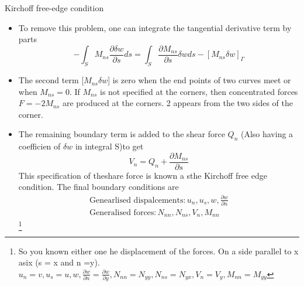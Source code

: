 	\begin{frame}{Kirchoff free-edge condition}
		\begin{itemize}
			\item To remove this problem, one can integrate the tangential derivative term by parts
			\begin{equation}
				-\int_S M_{ns}\frac{\partial \delta w}{\partial s} ds = \int_S \frac{\partial M_{ns}}{\partial s}\delta w ds - [M_{ns}\delta w]_{\Gamma}
			\end{equation}
			\item The second term [$M_{ns}\delta w$] is zero when the end points of two curves meet or when $M_{ns} = 0$. If $M_{ns}$ is not specified at the corners, then concentrated forces $F = -2M_{ns}$ are produced at the corners. 2 appears from the two sides of the corner. 
			\item The remaining boundary term is added to the shear force $Q_n$ (Also having a coefficien of $\delta w$ in integral  S)to get
			\begin{equation}
				V_n = Q_n + \frac{\partial M_{ns}}{\partial s}
			\end{equation}
			This specification of theshare force is known a sthe Kirchoff free edge condition. The final boundary conditions are 
			\begin{equation}
			\begin{aligned}
			\text{Genearlised dispalcements} : u_n, u_s,w,\frac{\partial w}{\partial n} \\
			\text{Generalised forces} : N_{nn}, N_{ns}, V_n, M_{nn}
			\end{aligned}
			\end{equation}
			\footnote{So you known either one he displacement of the forces. On a side parallel to x asix (s = x and n =y). $u_n =v, u_s = u, w, \frac{\partial w}{\partial n} = \frac{\partial w}{\partial y}, N_{nn}=N_{yy},N_{ns}=N_{yx}, V_n =V_y,M_{nn}=M_{yy}$}
		\end{itemize}
	\end{frame}


